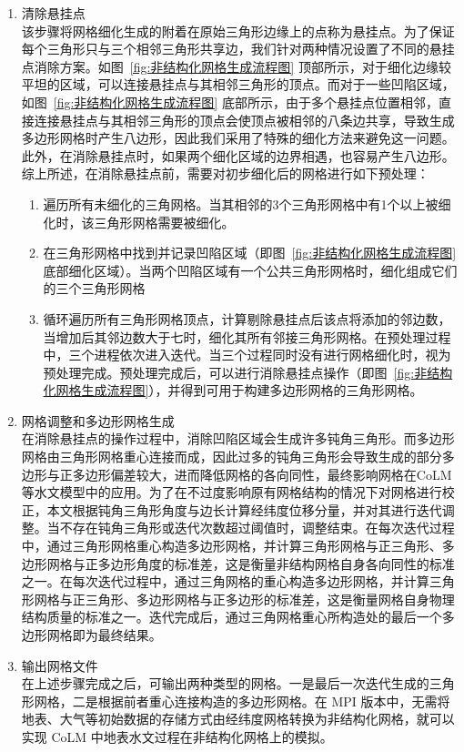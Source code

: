\begin{enumerate}
\item 清除悬挂点\\
该步骤将网格细化生成的附着在原始三角形边缘上的点称为悬挂点。为了保证每个三角形只与三个相邻三角形共享边，我们针对两种情况设置了不同的悬挂点消除方案。如图~\ref{fig:非结构化网格生成流程图} 顶部所示，对于细化边缘较平坦的区域，可以连接悬挂点与其相邻三角形的顶点。而对于一些凹陷区域，如图~\ref{fig:非结构化网格生成流程图} 底部所示，由于多个悬挂点位置相邻，直接连接悬挂点与其相邻三角形的顶点会使顶点被相邻的八条边共享，导致生成多边形网格时产生八边形，因此我们采用了特殊的细化方法来避免这一问题。此外，在消除悬挂点时，如果两个细化区域的边界相遇，也容易产生八边形。综上所述，在消除悬挂点前，需要对初步细化后的网格进行如下预处理：
\begin{enumerate}
\item 遍历所有未细化的三角网格。当其相邻的3个三角形网格中有1个以上被细化时，该三角形网格需要被细化。
\item 在三角形网格中找到并记录凹陷区域（即图~\ref{fig:非结构化网格生成流程图} 底部细化区域）。当两个凹陷区域有一个公共三角形网格时，细化组成它们的三个三角形网格
\item 循环遍历所有三角形网格顶点，计算剔除悬挂点后该点将添加的邻边数，当增加后其邻边数大于七时，细化其所有邻接三角形网格。在预处理过程中，三个进程依次进入迭代。当三个过程同时没有进行网格细化时，视为预处理完成。预处理完成后，可以进行消除悬挂点操作（即图~\ref{fig:非结构化网格生成流程图}），并得到可用于构建多边形网格的三角形网格。
\end{enumerate}
\item 网格调整和多边形网格生成\\
在消除悬挂点的操作过程中，消除凹陷区域会生成许多钝角三角形。而多边形网格由三角形网格重心连接而成，因此过多的钝角三角形会导致生成的部分多边形与正多边形偏差较大，进而降低网格的各向同性，最终影响网格在CoLM等水文模型中的应用。为了在不过度影响原有网格结构的情况下对网格进行校正，本文根据钝角三角形角度与边长计算经纬度位移分量，并对其进行迭代调整。当不存在钝角三角形或迭代次数超过阈值时，调整结束。在每次迭代过程中，通过三角形网格重心构造多边形网格，并计算三角形网格与正三角形、多边形网格与正多边形角度的标准差，这是衡量非结构网格自身各向同性的标准之一。在每次迭代过程中，通过三角网格的重心构造多边形网格，并计算三角形网格与正三角形、多边形网格与正多边形的标准差，这是衡量网格自身物理结构质量的标准之一。迭代完成后，通过三角网格重心所构造处的最后一个多边形网格即为最终结果。
\item 输出网格文件\\
在上述步骤完成之后，可输出两种类型的网格。一是最后一次迭代生成的三角形网格，二是根据前者重心连接构造的多边形网格。在 MPI 版本中，无需将地表、大气等初始数据的存储方式由经纬度网格转换为非结构化网格，就可以实现 CoLM 中地表水文过程在非结构化网格上的模拟。
\end{enumerate}


